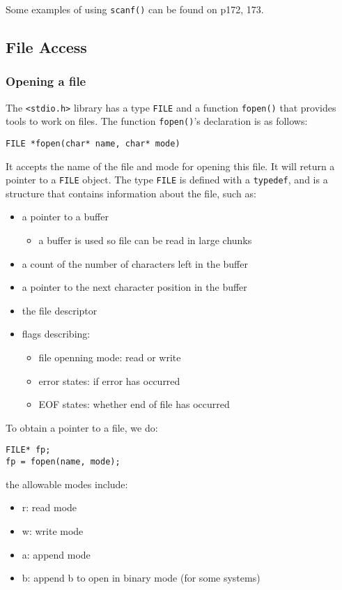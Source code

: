 \documentclass[12pt]{article}
\begin{document}
Some examples of using \texttt{scanf()} can be found on p172, 173.

\subsection{File Access\label{org7afd198}}
\label{sec:orgdb8c47e}
\subsubsection{Opening a file}
\label{sec:org8b7ec23}
The \texttt{<stdio.h>} library has a type \texttt{FILE} and a function \texttt{fopen()} that provides tools to work on files. The function \texttt{fopen()}'s declaration is as follows:
\begin{verbatim}
FILE *fopen(char* name, char* mode)
\end{verbatim}
It accepts the name of the file and mode for opening this file. It will return a pointer to a \texttt{FILE} object. The type \texttt{FILE} is defined with a \texttt{typedef}, and is a structure that contains information about the file, such as:
\begin{itemize}
\item a pointer to a buffer
\begin{itemize}
\item a buffer is used so file can be read in large chunks
\end{itemize}
\item a count of the number of characters left in the buffer
\item a pointer to the next character position in the buffer
\item the file descriptor
\item flags describing:
\begin{itemize}
\item file openning mode: read or write
\item error states: if error has occurred
\item EOF states: whether end of file has occurred
\end{itemize}
\end{itemize}

To obtain a pointer to a file, we do:
\begin{verbatim}
FILE* fp;
fp = fopen(name, mode);
\end{verbatim}
the allowable modes include:
\begin{itemize}
\item r: read mode
\item w: write mode
\item a: append mode
\item b: append b to open in binary mode (for some systems)
\end{itemize}
\end{document}
